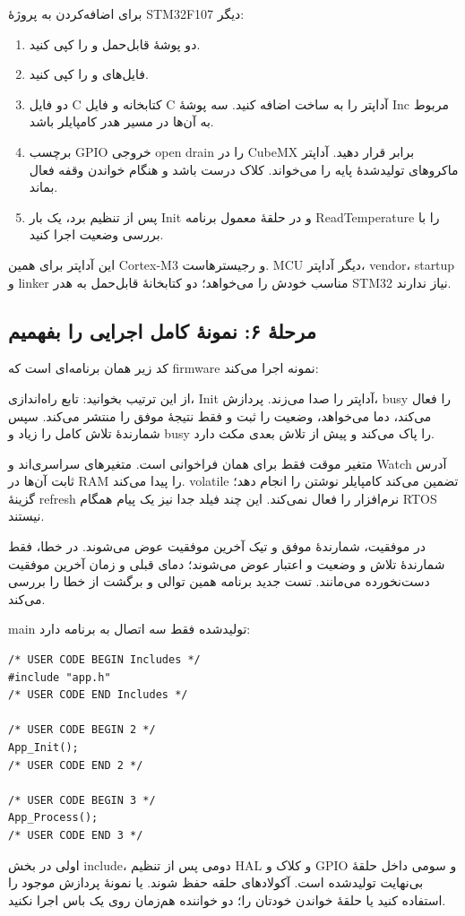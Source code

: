 برای اضافه‌کردن به پروژهٔ STM32F107 دیگر:
\begin{enumerate}
\item دو پوشهٔ قابل‌حمل
و
را کپی کنید.
\item فایل‌های
و
را کپی کنید.
\item دو فایل C کتابخانه و فایل C آداپتر را به ساخت اضافه کنید. سه پوشهٔ Inc مربوط به آن‌ها در مسیر هدر کامپایلر باشد.
\item برچسب GPIO خروجی open drain را در CubeMX برابر
قرار دهید. آداپتر ماکروهای تولیدشدهٔ پایه را می‌خواند. کلاک درست باشد و هنگام خواندن وقفه فعال بماند.
\item پس از تنظیم برد، یک بار Init و در حلقهٔ معمول برنامه ReadTemperature را با بررسی وضعیت اجرا کنید.
\end{enumerate}
این آداپتر برای همین Cortex-M3 و رجیسترهاست. MCU دیگر آداپتر، vendor، startup و linker مناسب خودش را می‌خواهد؛ دو کتابخانهٔ قابل‌حمل به هدر STM32 نیاز ندارند.

\subsection{مرحلهٔ ۶: نمونهٔ کامل اجرایی را بفهمیم}
کد زیر همان برنامه‌ای است که firmware نمونه اجرا می‌کند:
\begin{LTR}

\end{LTR}
از این ترتیب بخوانید: تابع راه‌اندازی، Init آداپتر را صدا می‌زند. پردازش، busy را فعال می‌کند، دما می‌خواهد، وضعیت را ثبت و فقط نتیجۀ موفق را منتشر می‌کند. سپس شمارندهٔ تلاش کامل را زیاد و busy را پاک می‌کند و پیش از تلاش بعدی مکث دارد.

متغیر موقت
فقط برای همان فراخوانی است. متغیرهای
سراسری‌اند و Watch آدرس ثابت آن‌ها در RAM را پیدا می‌کند. volatile تضمین می‌کند کامپایلر نوشتن را انجام دهد؛ گزینهٔ refresh نرم‌افزار را فعال نمی‌کند. این چند فیلد جدا نیز یک پیام همگام RTOS نیستند.

در موفقیت، شمارندهٔ موفق و تیک آخرین موفقیت عوض می‌شوند. در خطا، فقط شمارندهٔ تلاش و وضعیت و اعتبار عوض می‌شوند؛ دمای قبلی و زمان آخرین موفقیت دست‌نخورده می‌مانند. تست جدید برنامه همین توالی و برگشت از خطا را بررسی می‌کند.

main تولیدشده فقط سه اتصال به برنامه دارد:
\begin{LTR}
\begin{lstlisting}
/* USER CODE BEGIN Includes */
#include "app.h"
/* USER CODE END Includes */

/* USER CODE BEGIN 2 */
App_Init();
/* USER CODE END 2 */

/* USER CODE BEGIN 3 */
App_Process();
/* USER CODE END 3 */
\end{lstlisting}
\end{LTR}
اولی در بخش include، دومی پس از تنظیم HAL و کلاک و GPIO و سومی داخل حلقهٔ بی‌نهایت تولیدشده است. آکولادهای حلقه حفظ شوند. یا نمونهٔ پردازش موجود را استفاده کنید یا حلقهٔ خواندن خودتان را؛ دو خواننده هم‌زمان روی یک باس اجرا نکنید.

